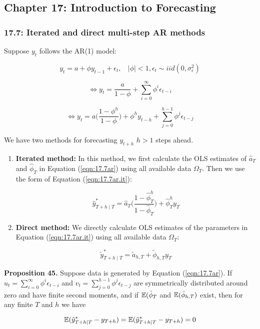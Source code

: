 
\subsection{Chapter 17: Introduction to Forecasting}

\subsubsection{17.7: Iterated and direct multi-step AR methods}

Suppose \(y_t\) follows the AR(1) model: 

\begin{equation} \label{eqn:17.7ar}
y_t = a + \phi y_{t-1} + \epsilon_t, \ \ \ \ |\phi| < 1, \epsilon_t \sim iid(0, \sigma_\epsilon^2)
\end{equation}

\[
\iff y_t =  \frac{a}{1 - \phi} + \sum_{i=0}^\infty \phi^i \epsilon_{t-i}
\]

\begin{equation} \label{eqn:17.7ar.it}
\iff y_t = a \bigg( \frac{1 - \phi^h}{1 - \phi} \bigg) + \phi^h y_{t-h} + \sum_{j=0}^{h-1} \phi^j \epsilon_{t-j}
\end{equation}

We have two methods for forecasting \(y_{t+h}\) \(h >1\) steps ahead.

\begin{enumerate}[(1)]

\item \textbf{Iterated method:} In this method, we first calculate the OLS estimates of \(\hat{a}_T\) and \(\hat{\phi}_T\) in Equation (\ref{eqn:17.7ar}) using all available data \(\Omega_T\). Then we use the form of Equation (\ref{eqn:17.7ar.it}):

\[
\hat{y}_{T+h \mid T}^* = \hat{a}_T \bigg( \frac{1 - \hat{\phi}_T^h}{1 - \hat{\phi}_T} \bigg) + \hat{\phi}_T^h y_{T} 
\] 

\item \textbf{Direct method:} We directly calculate OLS estimates of the parameters in Equation (\ref{eqn:17.7ar.it}) using all available data \(\Omega_T\):

\[
\tilde{y}_{T+h \mid T}^* = \tilde{a}_{h,T} + \tilde{\phi}_{h,T} y_{T} 
\] 

\end{enumerate}

\textbf{Proposition 45.} Suppose data is generated by Equation (\ref{eqn:17.7ar}). If \(u_t = \sum_{i=0}^\infty \phi^i \epsilon_{t-i}\) and \(v_t = \sum_{j=0}^{h-1} \phi^j \epsilon_{t-j}\) are symmetrically distributed around zero and have finite second moments, and if \(\mathbb{E}(\hat{\phi}_T\) and \(\mathbb{E}(\tilde{\phi}_{h,T} )\) exist, then for any finite \(T\) and \(h\) we have

\[
\mathbb{E}(\hat{y}_{T+h \mid T}^* - y_{T +h}) = \mathbb{E} (\tilde{y}_{T+h \mid T}^* - y_{T+h}) = 0
\]

%
%
%
%
%
%

%
